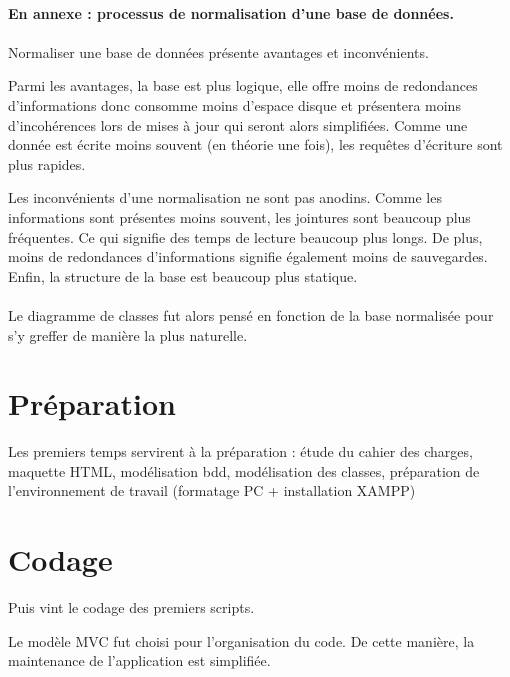 \documentclass[a4paper,12pt,titlepage]{report}
\begin{document}
\paragraph*{}
\textbf{En annexe : processus de normalisation d'une base de données.}

\newpage

\paragraph*{}
Normaliser une base de données présente avantages et inconvénients.


Parmi les avantages, la base est plus logique, elle offre moins de redondances d'informations donc consomme moins d'espace disque et présentera moins d'incohérences lors de mises à jour qui seront alors simplifiées. Comme une donnée est écrite moins souvent (en théorie une fois), les requêtes d'écriture sont plus rapides.

Les inconvénients d'une normalisation ne sont pas anodins. Comme les informations sont présentes moins souvent, les jointures sont beaucoup plus fréquentes. Ce qui signifie des temps de lecture beaucoup plus longs. De plus, moins de redondances d'informations signifie également moins de sauvegardes. Enfin, la structure de la base est beaucoup plus statique.

\paragraph*{}
Le diagramme de classes fut alors pensé en fonction de la base normalisée pour s'y greffer de manière la plus naturelle.



\section{Préparation}

Les premiers temps servirent à la préparation : étude du cahier des charges, maquette HTML, modélisation bdd, modélisation des classes, préparation de l'environnement de travail (formatage PC + installation XAMPP)


\section{Codage}

Puis vint le codage des premiers scripts.

Le modèle MVC fut choisi pour l'organisation du code. De cette manière, la maintenance de l'application est simplifiée.
\end{document}
